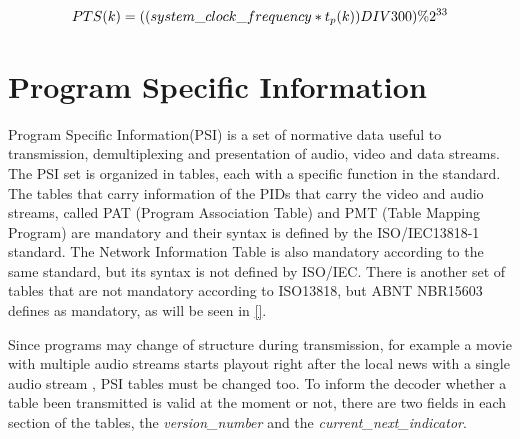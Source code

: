 \documentclass[
	12pt,				%
	openright,			%
	twoside,			%
	a4paper,			%
	brazil,
	french,				%
	english
	]{abntex2}
\begin{document}
\begin{equation}
PTS(k) = ((system\_clock\_frequency * t_p(k)) DIV 300) \% 2^{33}\\
\label{eq:pts}
\end{equation}





\section{Program Specific Information}

Program Specific Information(PSI) is a set of normative data useful to transmission, demultiplexing and presentation of audio, video and data streams. The PSI set is organized in tables, each with a specific function in the standard. The tables that carry information of the PIDs that carry the video and audio streams, called PAT (Program Association Table) and PMT (Table Mapping Program) are mandatory and their syntax is defined by the ISO/IEC13818-1 standard. The Network Information Table is also mandatory according to the same standard, but its syntax is not defined by ISO/IEC. There is another set of tables that are not mandatory according to ISO13818, but ABNT NBR15603 defines as mandatory, as will be seen in \autoref{}.

Since programs may change of structure during transmission, for example a movie with multiple audio streams starts playout right after the local news with a single audio stream , PSI tables must be changed too. To inform the decoder whether a table been transmitted is valid at the moment or not, there are two fields in each section of the tables, the \textit{version\_number} and the \textit{current\_next\_indicator}.
\end{document}

